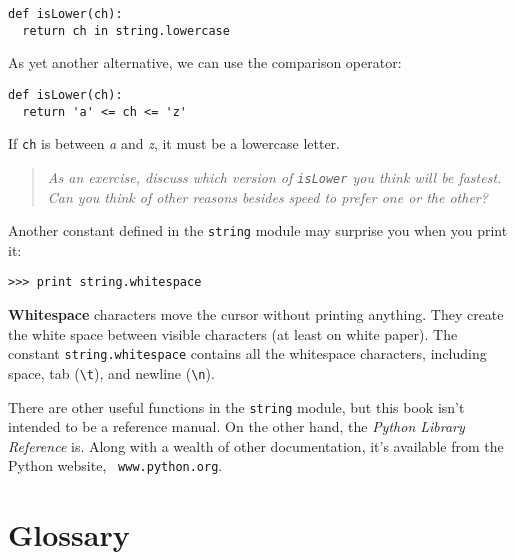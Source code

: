 \beforeverb
\begin{verbatim}
def isLower(ch):
  return ch in string.lowercase
\end{verbatim}
\afterverb
%
As yet another alternative, we can use the comparison operator:

\beforeverb
\begin{verbatim}
def isLower(ch):
  return 'a' <= ch <= 'z'
\end{verbatim}
\afterverb
%
If {\tt ch} is between {\em a} and {\em z}, it must be a lowercase
letter.

\begin{quote}
{\em As an exercise, discuss which version of {\tt isLower} you think
will be fastest.  Can you think of other reasons besides speed to
prefer one or the other?}
\end{quote}

Another constant defined in the {\tt string} module may
surprise you when you print it:

\beforeverb
\begin{verbatim}
>>> print string.whitespace
\end{verbatim}
\afterverb
%
{\bf Whitespace} characters move the cursor without printing
anything.  They create the white space between visible
characters (at least on white paper).  The constant
{\tt string.whitespace} contains all the
whitespace characters, including
space, tab (\verb+\t+), and newline
(\verb+\n+).


There are other useful functions in the {\tt string} module, but this
book isn't intended to be a reference manual.  On the other hand, the
{\em Python Library Reference} is.  Along with a wealth of other
documentation, it's available from the Python website, {\tt
www.python.org}.


\section{Glossary}

